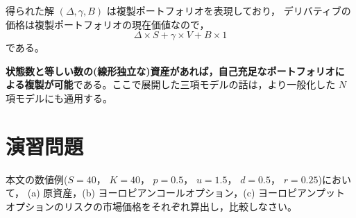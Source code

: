 得られた解 $(\Delta,\gamma,B)$ は複製ポートフォリオを表現しており，
デリバティブの価格は複製ポートフォリオの現在価値なので，
\begin{equation}
\Delta\times S + \gamma\times V + B\times 1
\end{equation}
である。

\begin{keypoint}
\textbf{状態数と等しい数の(線形独立な)資産があれば，自己充足なポートフォリオに
よる複製が可能}である。ここで展開した三項モデルの話は，より一般化した
$N$項モデルにも通用する。
\end{keypoint}

\section{演習問題}

\begin{exercise}[問題10-1]
本文の数値例($S=40$， $K=40$， $p=0.5$， $u=1.5$， $d=0.5$， $r=0.25$)において，
(a) 原資産，(b) ヨーロピアンコールオプション，(c) ヨーロピアンプット
オプションのリスクの市場価格をそれぞれ算出し，比較しなさい。
\end{exercise}

